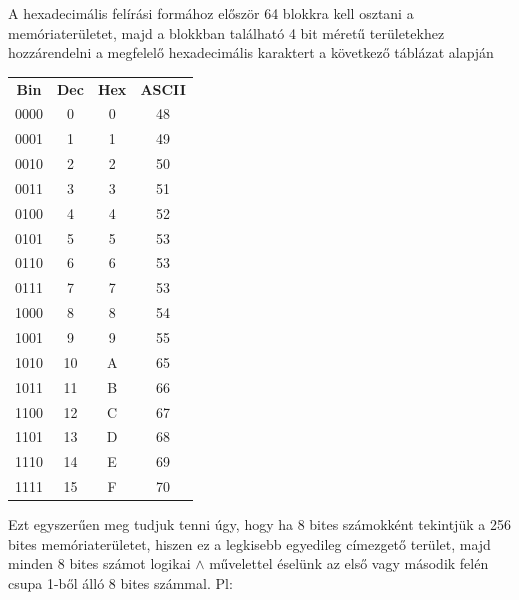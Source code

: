 A hexadecimális felírási formához először 64 blokkra kell osztani a memóriaterületet, majd a blokkban található 4 bit méretű területekhez hozzárendelni a megfelelő hexadecimális karaktert a következő táblázat alapján
%
\begin{table}[H]
    \centering
    \begin{tabular}{cccc}

        \textbf{Bin}   &   \textbf{Dec}   &   \textbf{Hex}   &   \textbf{ASCII} \\
        0000   &   0    &   0   &   48 \\
        0001   &   1    &   1   &   49 \\
        0010   &   2    &   2   &   50 \\
        0011   &   3    &   3   &   51 \\
        0100   &   4    &   4   &   52 \\
        0101   &   5    &   5   &   53 \\
        0110   &   6    &   6   &   53 \\
        0111   &   7    &   7   &   53 \\
        1000   &   8    &   8   &   54 \\
        1001   &   9    &   9   &   55 \\
        1010   &   10   &   A   &   65 \\
        1011   &   11   &   B   &   66 \\
        1100   &   12   &   C   &   67 \\
        1101   &   13   &   D   &   68 \\
        1110   &   14   &   E   &   69 \\
        1111   &   15   &   F   &   70 \\
    
    \end{tabular}
\end{table}
%
Ezt egyszerűen meg tudjuk tenni úgy, hogy ha 8 bites számokként tekintjük a 256 bites memóriaterületet, hiszen ez a legkisebb egyedileg címezgető terület, majd minden 8 bites számot logikai $\land$ művelettel éselünk az első vagy második felén csupa 1-ből álló 8 bites számmal. Pl:

